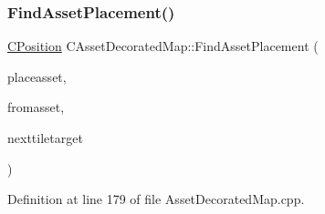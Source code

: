 \subsubsection{\texorpdfstring{Find\+Asset\+Placement()}{FindAssetPlacement()}}
{\footnotesize\ttfamily \hyperlink{classCPosition}{C\+Position} C\+Asset\+Decorated\+Map\+::\+Find\+Asset\+Placement (\begin{DoxyParamCaption}\item[{std\+::shared\+\_\+ptr$<$ \hyperlink{classCPlayerAsset}{C\+Player\+Asset} $>$}]{placeasset,  }\item[{std\+::shared\+\_\+ptr$<$ \hyperlink{classCPlayerAsset}{C\+Player\+Asset} $>$}]{fromasset,  }\item[{const \hyperlink{classCPosition}{C\+Position} \&}]{nexttiletarget }\end{DoxyParamCaption})}



Definition at line 179 of file Asset\+Decorated\+Map.\+cpp.


